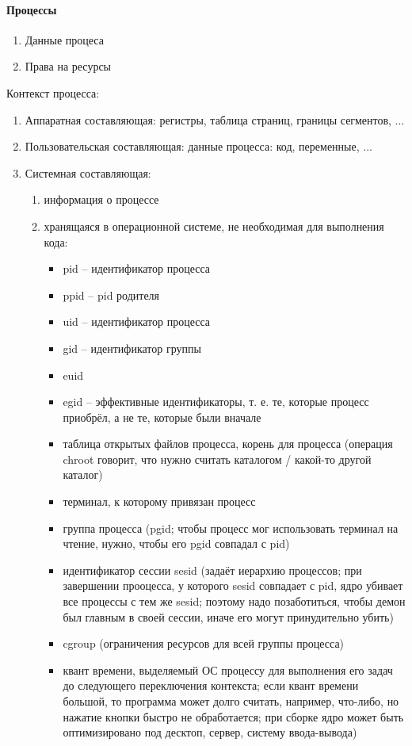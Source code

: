 \documentclass[a4paper,10pt]{article}
\begin{document}
\paragraph{Процессы}
\begin{enumerate}
\item Данные процеса
\item Права на ресурсы
\end{enumerate}
Контекст процесса:
\begin{enumerate}
\item Аппаратная составляющая: регистры, таблица страниц, границы сегментов, ...
\item Пользовательская составляющая: данные процесса: код, переменные, ... 
\item Системная составляющая: 
\begin{enumerate}
\item информация о процессе
\item хранящаяся в операционной системе, не необходимая для выполнения кода: 
\begin{itemize}
\item pid -- идентификатор процесса
\item ppid -- pid родителя
\item uid -- идентификатор процесса
\item gid -- идентификатор группы
\item euid
\item egid -- эффективные идентификаторы, т. е. те, которые процесс приобрёл, а не те, которые были вначале
\item таблица открытых файлов процесса, корень для процесса (операция chroot говорит, что нужно считать каталогом / какой-то другой каталог)
\item терминал, к которому привязан процесс
\item группа процесса (pgid; чтобы процесс мог использовать терминал на чтение, нужно, чтобы его pgid совпадал с pid)
\item идентификатор сессии sesid (задаёт иерархию процессов; при завершении прооцесса, у которого sesid совпадает с pid, ядро убивает все процессы с тем же sesid; поэтому надо позаботиться, чтобы демон был главным в своей сессии, иначе его могут принудительно убить)
\item cgroup (ограничения ресурсов для всей группы процесса)
\item квант времени, выделяемый ОС процессу для выполнения его задач до следующего переключения контекста; если квант времени большой, то программа может долго считать, например, что-либо, но нажатие кнопки быстро не обработается; при сборке ядро может быть оптимизировано под десктоп, сервер, систему ввода-вывода)

\end{itemize}
\end{enumerate}
\end{enumerate}
\end{document}

